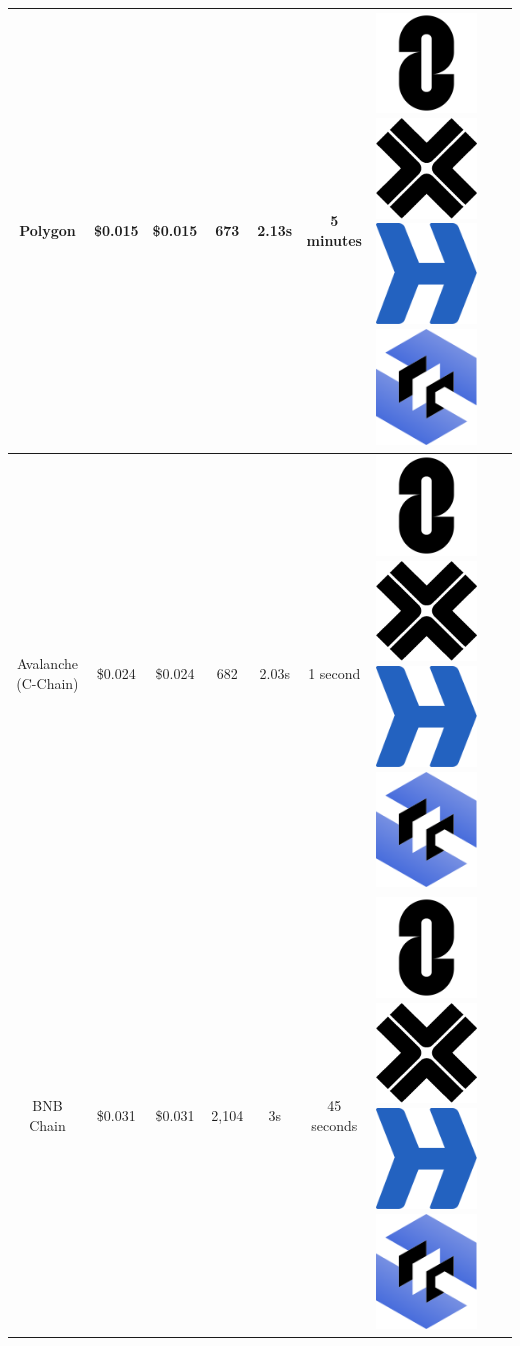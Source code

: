 \documentclass[fleqn,10pt]{olplainarticle}
\begin{document}
\begin{table}[H]
\begin{tabular}{|c|c|c|c|c|c|c|c|c|}
		Polygon & \cellcolor[RGB]{255,150,0}\$0.015  & \cellcolor[RGB]{150,255,100}\$0.015  & \cellcolor[RGB]{130,255,10}673 & \cellcolor[RGB]{255,200,0}2.13s & \cellcolor[RGB]{255,100,0}5 minutes \cite{idex_polygon_nodate} & \includegraphics[width=0.03\linewidth]{img/logoLayerZero} \includegraphics[width=0.03\linewidth]{img/logoAxelar} \includegraphics[width=0.03\linewidth]{img/logoHyperlane} \includegraphics[width=0.03\linewidth]{img/logoCCIP} & & \\ \hline	
		
		Avalanche (C-Chain) & \cellcolor[RGB]{255,100,0}\$0.024 & \cellcolor[RGB]{200,255,0}\$0.024  & \cellcolor[RGB]{100,255,100}682 & \cellcolor[RGB]{150,255,100}2.03s & \cellcolor[RGB]{0,255,0}1 second \cite{asim_time_nodate} & \includegraphics[width=0.03\linewidth]{img/logoLayerZero} \includegraphics[width=0.03\linewidth]{img/logoAxelar}  \includegraphics[width=0.03\linewidth]{img/logoHyperlane}  \includegraphics[width=0.03\linewidth]{img/logoCCIP} & & \\ \hline
		
		BNB Chain & \cellcolor[RGB]{255,50,0}\$0.031 & \cellcolor[RGB]{255,200,0}\$0.031 & \cellcolor[RGB]{0,255,0}2,104 & \cellcolor[RGB]{255,150,0}3s  & \cellcolor[RGB]{150,255,100}45 seconds \cite{bnb_chain_coming_nodate} & \includegraphics[width=0.03\linewidth]{img/logoLayerZero} \includegraphics[width=0.03\linewidth]{img/logoAxelar} \includegraphics[width=0.03\linewidth]{img/logoHyperlane} \includegraphics[width=0.03\linewidth]{img/logoCCIP} & & \\ \hline
		

\end{tabular}
\end{table}
\end{document}
